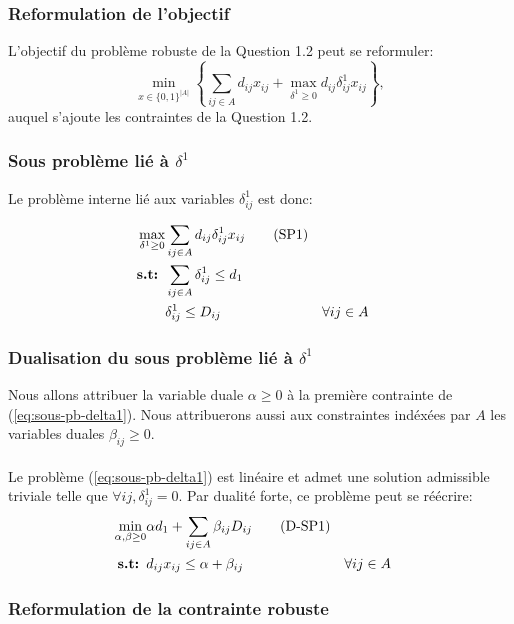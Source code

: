 \documentclass{article}
\begin{document}
\subsubsection{Reformulation de l'objectif}

L'objectif du problème robuste de la Question 1.2 peut se reformuler:
$$ \min_{x \in \{0,1\}^{|A|}} \left\{ \sum_{ij \in A} d_{ij} x_{ij} + \max_{\delta^{1} \geq 0} d_{ij} \delta_{ij}^{1} x_{ij} \right\},$$
auquel s'ajoute les contraintes de la Question 1.2.

\subsubsection{Sous problème lié à $\delta^{1}$}

Le problème interne lié aux variables $\delta^{1}_{ij}$ est donc:

\begin{align}
  \max_{\delta^{1}\geq 0} & \sum_{ij \in A} d_{ij} \delta_{ij}^{1} x_{ij} \tag{SP1} \label{eq:sous-pb-delta1}  \\
  \textbf{s.t: } &\sum_{ij \in A} \delta_{ij}^{1} \leq d_1 \notag \\
  &\delta_{ij}^{1} \leq D_{ij} && \forall ij \in A \notag
\end{align}

\subsubsection{Dualisation du sous problème lié à $\delta^{1}$}

Nous allons attribuer la variable duale $\alpha \geq 0$ à la première contrainte de (\ref{eq:sous-pb-delta1}). Nous attribuerons aussi aux constraintes indéxées par $A$ les variables duales $\beta_{ij} \geq 0$.
\\
\\
Le problème (\ref{eq:sous-pb-delta1}) est linéaire et admet une solution admissible triviale telle que $\forall ij, \delta^{1}_{ij} = 0$. Par dualité forte, ce problème peut se réécrire:
\begin{align}
  \min_{\alpha, \beta \geq 0} & \alpha d_1  + \sum_{ij \in A} \beta_{ij} D_{ij} \tag{D-SP1} \label{eq:dual-sous-pb-delta1}  \\
  \textbf{s.t: } &d_{ij} x_{ij} \leq \alpha + \beta_{ij} && \forall ij \in A \notag
\end{align}

\subsubsection{Reformulation de la contrainte robuste}
\end{document}

